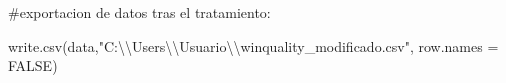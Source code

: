 \documentclass[
]{article}
\newenvironment{Shaded}{\begin{snugshade}}{\end{snugshade}}
\newcommand{\AttributeTok}[1]{\textcolor[rgb]{0.77,0.63,0.00}{#1}}
\newcommand{\ConstantTok}[1]{\textcolor[rgb]{0.00,0.00,0.00}{#1}}
\newcommand{\FunctionTok}[1]{\textcolor[rgb]{0.00,0.00,0.00}{#1}}
\newcommand{\NormalTok}[1]{#1}
\newcommand{\SpecialCharTok}[1]{\textcolor[rgb]{0.00,0.00,0.00}{#1}}
\newcommand{\StringTok}[1]{\textcolor[rgb]{0.31,0.60,0.02}{#1}}
\begin{document}
\#exportacion de datos tras el tratamiento:

\begin{Shaded}
\begin{Highlighting}[]
\FunctionTok{write.csv}\NormalTok{(data,}\StringTok{"C:}\SpecialCharTok{\textbackslash{}\textbackslash{}}\StringTok{Users}\SpecialCharTok{\textbackslash{}\textbackslash{}}\StringTok{Usuario}\SpecialCharTok{\textbackslash{}\textbackslash{}}\StringTok{winquality\_modificado.csv"}\NormalTok{, }\AttributeTok{row.names =} \ConstantTok{FALSE}\NormalTok{)}
\end{Highlighting}
\end{Shaded}
\end{document}

